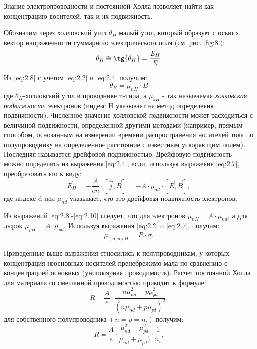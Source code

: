 Знание электропроводности и постоянной Холла позволяет найти как концентрацию носителей, так и их подвижность.

Обозначим через холловский угол $\theta_H$ малый угол, который образует с осью х вектор напряженности суммарного электрического поля (см. рис. \ref{fig:8}):
\begin{equation}
\label{eq:2.8}
	\theta_H \cong \tg{\theta_H}=\frac{E_H}{E}
\end{equation}

Из \ref{eq:2.8} с учетом \ref{eq:2.2} и \ref{eq:2.4} получим:
\begin{equation}
\label{eq:2.9}
	\theta_H = \mu_{nH} \cdot B
\end{equation}
где $\theta_H$-холловский угол в проводнике n-типа, а $\mu_{nH}$ - так называемая \textit{холловская подвижность} электронов (индекс H указывает на метод определения подвижности). Численное значение холловской подвижности может расходиться с величиной подвижности, определенной другими методами (например, прямым способом, основанным на измерении времени распространения носителей тока по полупроводнику на определенное расстояние с известным ускоряющим полем). Последняя называется дрейфовой подвижностью. Дрейфовую подвижность можно определить из выражения \ref{eq:2.4}, если, используя выражение \ref{eq:2.7}, преобразовать его к виду:
\begin{equation}
\label{eq:2.10}
	\vec E_H = -\frac{A}{en}\cdot[\vec j, \vec B]=-A\cdot \mu_{nd} \cdot [\vec E,\vec B],
\end{equation}
где индекс d при $\mu_{nd}$ указывает, что это дрейфовая подвижность электронов.

Из выражений \eqref{eq:2.8}-\eqref{eq:2.10} следует, что для электронов $\mu_{nH}=A\cdot \mu_{nd}$, а для дырок $\mu_{pH}=A\cdot \mu_{pd}$. Используя выражения \eqref{eq:2.2} и \eqref{eq:2.7}, получим:
\begin{equation}
\label{eq:2.11}
	\mu_{(n,p)H}=R\cdot \sigma.
\end{equation}

Приведенные выше выражения относились к полупроводникам, у которых концентрация неосновных носителей пренебрежимо мала по сравнению с концентрацией основных (униполярная проводимость). Расчет постоянной Холла для материала со смешанной проводимостью приводит к формуле:
\begin{equation}
\label{eq:2.12}
	R= \frac{A}{e}\cdot \frac{n\mu^2_{nd}-p\mu^2_{pd}}{(n\mu_{nd}+p\mu_{pd})^2}.
\end{equation}
для собственного полупроводника $(n=p=n_i)$ получим:
\begin{equation}
\label{eq:2.12}
	R= \frac{A}{e}\cdot \frac{\mu^2_{nd}-\mu^2_{pd}}{\mu_{nd}+\mu_{pd})}\cdot \frac{1}{n_i}.
\end{equation}

